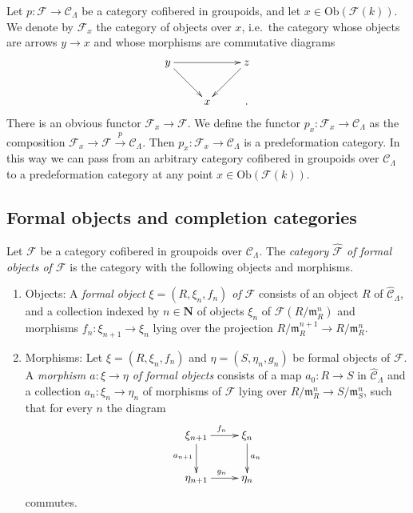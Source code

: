 \begin{remark}
\label{remark-localize-cofibered-groupoid} 
Let $p: \mathcal{F} \to \mathcal{C}_\Lambda$ be a category cofibered in 
groupoids, and let $x \in \text{Ob}(\mathcal{F}(k))$.  We denote by 
$\mathcal{F}_{x}$ the category of objects over $x$, i.e.\ the category whose 
objects are arrows $y \to x$ and whose morphisms are commutative 
diagrams
\[
\xymatrix{
y \ar[rr] \ar[dr] &   & z \ar[dl] \\
                 & x &. 
}
\]
There is an obvious functor $\mathcal{F}_{x} \to \mathcal{F}$.  We define 
the functor $p_x: \mathcal{F}_{x} \to \mathcal{C}_\Lambda$ as the 
composition $\mathcal{F}_x \to \mathcal{F} \xrightarrow{p} \mathcal 
C_\Lambda$. Then $p_x : \mathcal{F}_x \to \mathcal{C}_\Lambda$ is a 
predeformation category.  In this way we can pass from an arbitrary category 
cofibered in groupoids over $\mathcal{C}_\Lambda$ to a predeformation category 
at any point $x \in \text{Ob}(\mathcal{F}(k))$.
\end{remark}


\subsection{Formal objects and completion categories}
\label{subsection-formal-objects}

\begin{definition}
\label{definition-formal-objects}
Let $\mathcal{F}$ be a category cofibered in groupoids over
$\mathcal{C}_\Lambda$. The {\it category $\widehat{\mathcal{F}}$ of formal
objects of  $\mathcal{F}$} is the category with the following objects and
morphisms.
\begin{enumerate}
\item Objects: A {\it formal object $\xi = (R, \xi_n, f_n)$ of $\mathcal{F}$} 
consists of an object $R$ of $\widehat{\mathcal{C}}_\Lambda$, and a collection 
indexed by $n \in \mathbf{N}$ of objects $\xi_{n}$ of $\mathcal 
F(R/\mathfrak{m}_R^{n})$ and morphisms $f_{n}: \xi_{n+1} \to \xi_{n}$ 
lying over the projection $R/\mathfrak{m}_R^{n+1} \to 
R/\mathfrak{m}_R^{n}$.
\item Morphisms: Let $\xi = (R,\xi_n,f_n)$ and $\eta = (S,\eta_n,g_n)$ be 
formal objects of $\mathcal{F}$.  A {\it morphism $a: \xi \to \eta$ of 
formal objects} consists of a map $a_0: R \to S$ in $\widehat{\mathcal 
C}_\Lambda$ and a collection $a_n: \xi_n \to \eta_n$ of morphisms of 
$\mathcal{F}$ lying over $R/\mathfrak{m}_R^n \to S/\mathfrak{m}_S^n$, 
such that for every $n$ the diagram
\[
\xymatrix{
\xi_{n+1} \ar[r]^{f_{n}} \ar[d]_{a_{n+1}} & \xi_{n} \ar[d]^{a_{n}} \\
\eta_{n+1} \ar[r]^{g_{n}} & \eta_{n} 
}
\]
commutes.
\end{enumerate}
\end{definition}

